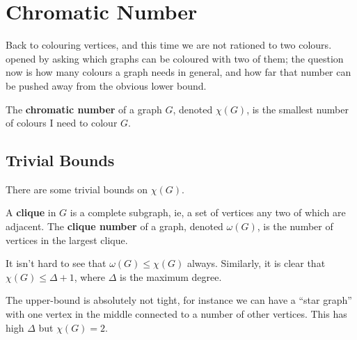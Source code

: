 \section{Chromatic Number}

Back to colouring vertices, and this time we are not rationed to two colours.  opened by asking which graphs can be coloured with two of them; the question now is how many colours a graph needs in general, and how far that number can be pushed away from the obvious lower bound.

\begin{boxdefinition} \label{Ch2:Def:Chromatic_Number}
    The \textbf{chromatic number} of a graph $G$, denoted $\chi(G)$, is the smallest number of colours I need to colour $G$.
\end{boxdefinition}

\subsection{Trivial Bounds}

There are some trivial bounds on $\chi(G)$.

\begin{boxdefinition}[Clique] \label{Ch2:Def:Clique}
    A \textbf{clique} in $G$ is a complete subgraph, ie, a set of vertices any two of which are adjacent. The \textbf{clique number} of a graph, denoted $\omega(G)$, is the number of vertices in the largest clique.
\end{boxdefinition}

It isn't hard to see that $\omega(G) \leq \chi(G)$ always. Similarly, it is clear that $\chi(G) \leq \Delta + 1$, where $\Delta$ is the maximum degree.

The upper-bound is absolutely not tight, for instance we can have a ``star graph'' with one vertex in the middle connected to a number of other vertices. This has high $\Delta$ but $\chi(G) = 2$.

\begin{figure}[H]
    \centering
\end{figure}

